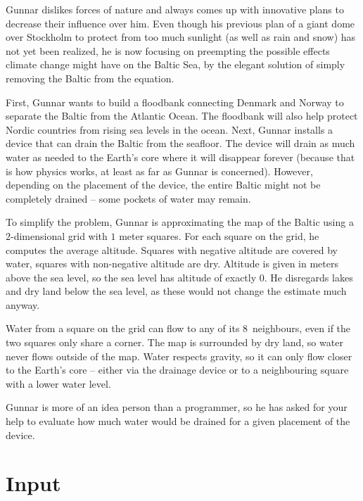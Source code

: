 
%
Gunnar dislikes forces of nature and always comes up with innovative plans to decrease their
influence over him. Even though his previous plan of a giant dome over Stockholm to protect from too
much sunlight (as well as rain and snow) has not yet been realized, he is now focusing on preempting
the possible effects climate change might have on the Baltic Sea, by the elegant solution of simply
removing the Baltic from the equation.

First, Gunnar wants to build a floodbank connecting Denmark and Norway to separate the Baltic from
the Atlantic Ocean. The floodbank will also help protect Nordic countries from rising sea levels in the
ocean. Next, Gunnar installs a device that can drain the Baltic from the seafloor. The device will
drain as much water as needed to the Earth's core where it will disappear forever (because that is how physics works, at least as far as Gunnar is concerned).  However, depending on the placement of the device, the entire Baltic might not be completely drained -- some pockets of water may remain.

To simplify the problem, Gunnar is approximating the map of the Baltic using a $2$-dimensional grid
with $1$ meter squares. For each square on the grid, he computes the average altitude. Squares
with negative altitude are covered by water, squares with non-negative altitude are dry. Altitude is
given in meters above the sea level, so the sea level has altitude of exactly $0$. He
disregards lakes and dry land below the sea level, as these would not change the estimate much
anyway.

Water from a square on the grid can flow to any of its $8$~neighbours, even if the two squares only
share a corner. The map is surrounded by dry land, so water never flows outside of the map. Water
respects gravity, so it can only flow closer to the Earth's core -- either via the drainage device
or to a neighbouring square with a lower water level.

Gunnar is more of an idea person than a programmer, so he has asked for your help to evaluate how much water would be drained for a given placement of the device.



\section*{Input}

